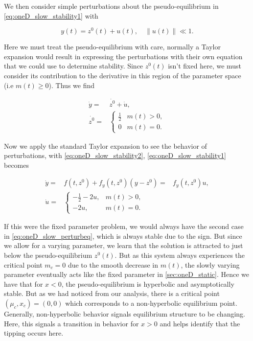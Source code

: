 We then consider simple perturbations about the pseudo-equilibrium in \eqref{eq:oneD_slow_stability1} with

\begin{equation*}
y(t)=z^0(t)+u(t), \quad \lVert u(t) \rVert \ll 1.
\end{equation*}

Here we must treat the pseudo-equilibrium with care, normally a Taylor expansion would result in expressing the perturbations with their own equation that we could use to determine stability. Since $z^0(t)$ isn't fixed here, we must consider its contribution to the derivative in this region of the parameter space (i.e $m(t)\ge 0$). Thus we find

\begin{equation}\label{eq:oneD_slow_stability2}
\begin{aligned}
\dot{y} =& \dot{z^0}+\dot{u},\\
\dot{z^0}= & \begin{cases}
\frac{1}{2} & m(t)>0,\\
0 & m(t)=0.
\end{cases}
\end{aligned}
\end{equation}

Now we apply the standard Taylor expansion to see the behavior of perturbations, with \eqref{eq:oneD_slow_stability2}, \eqref{eq:oneD_slow_stability1} becomes

\begin{equation}\label{eq:oneD_slow_perturbeq}
\begin{aligned}
\dot{y}=& f(t,z^0)+f_y(t,z^0)(y-z^0)
=& f_y(t,z^0)u,\\
\dot{u}=&\begin{cases}
-\frac{1}{2}-2u, & m(t)>0,\\
-2u, & m(t)=0.
\end{cases}
\end{aligned}
\end{equation}

If this were the fixed parameter problem, we would always have the second case in \eqref{eq:oneD_slow_perturbeq}, which is always stable due to the sign. But since we allow for a varying parameter, we learn that the solution is attracted to just below the pseudo-equilibrium $z^0(t)$. But as this system always experiences the critical point $m_c=0$ due to the smooth decrease in $m(t)$, the slowly varying parameter eventually acts like the fixed parameter in \autoref{sec:oneD_static}. Hence we have that for $x<0$, the pseudo-equilibrium is hyperbolic and asymptotically stable. But as we had noticed from our analysis, there is a critical point $(\mu_c,x_c)=(0,0)$ which corresponds to a non-hyperbolic equilibrium point. Generally, non-hyperbolic behavior signals equilibrium structure to be changing. Here, this signals a transition in behavior for $x>0$ and helps identify that the tipping occurs here.

